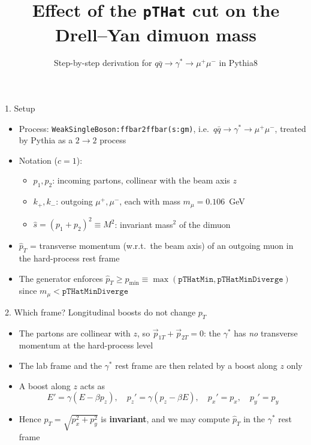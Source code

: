\documentclass[aspectratio=169]{beamer}
\title{Effect of the \texttt{pTHat} cut on the Drell--Yan dimuon mass}
\subtitle{Step-by-step derivation for $q\bar q \to \gamma^* \to \mu^+\mu^-$ in Pythia8}
\author{}
\date{}
\begin{document}
\begin{frame}
  \titlepage
\end{frame}

\begin{frame}{1. Setup}
  \begin{itemize}
    \item Process: \texttt{WeakSingleBoson:ffbar2ffbar(s:gm)}, i.e.\
          $q\bar q \to \gamma^* \to \mu^+\mu^-$, treated by Pythia as a $2\to2$ process
    \item Notation ($c=1$):
      \begin{itemize}
        \item $p_1,p_2$: incoming partons, collinear with the beam axis $z$
        \item $k_+,k_-$: outgoing $\mu^+,\mu^-$, each with mass $m_\mu = 0.106$~GeV
        \item $\hat s = (p_1+p_2)^2 \equiv M^2$: invariant mass$^2$ of the dimuon
      \end{itemize}
    \item $\hat p_T$ = transverse momentum (w.r.t.\ the beam axis) of an outgoing muon in the
          hard-process rest frame
    \item The generator enforces $\hat p_T \ge p_{\min} \equiv \max(\texttt{pTHatMin},\texttt{pTHatMinDiverge})$
          since $m_\mu < \texttt{pTHatMinDiverge}$
  \end{itemize}
\end{frame}

\begin{frame}{2. Which frame? Longitudinal boosts do not change $p_T$}
  \begin{itemize}
    \item The partons are collinear with $z$, so $\vec p_{1T}+\vec p_{2T}=0$:
          the $\gamma^*$ has \emph{no} transverse momentum at the hard-process level
    \item The lab frame and the $\gamma^*$ rest frame are then related by a boost along $z$ only
    \item A boost along $z$ acts as
    \[
      E' = \gamma(E - \beta p_z),\quad p_z' = \gamma(p_z - \beta E),\quad p_x' = p_x,\quad p_y'=p_y
    \]
    \item Hence $p_T=\sqrt{p_x^2+p_y^2}$ is \textbf{invariant}, and we may compute $\hat p_T$ in the
          $\gamma^*$ rest frame
  \end{itemize}
\end{frame}
\end{document}
